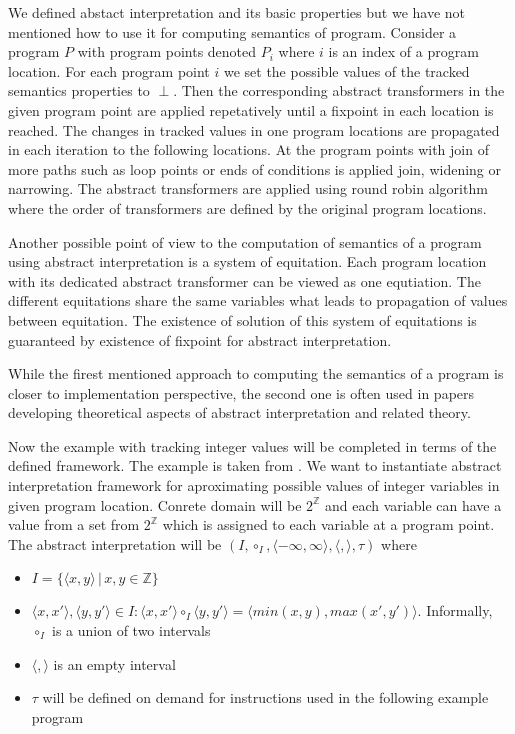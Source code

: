 \documentclass[a4paper, 12pt]{article}
\newcommand{\interval}[2]{\langle #1,#2 \rangle}
\newcommand{\ainf}[0]{\perp}
\newcommand{\atrans}[0]{\tau}
\newcommand{\ajoin}[0]{\circ}
\newcommand{\intg}[0]{\mathbb{Z}}
\newcommand{\iintg}[0]{I}
\newcommand{\ijoin}[0]{\ajoin_\iintg}
\begin{document}
We defined abstact interpretation and its basic properties
but we have not mentioned how to use it for computing
semantics of program.
Consider a program $P$ with program points denoted $P_i$
where $i$ is an index of a program location.
For each program point $i$ we set the possible values of the tracked
semantics properties to $\ainf$.
Then the corresponding abstract transformers in the given program point
are applied repetatively until a fixpoint in each location is reached.
The changes in tracked values in one program locations are propagated in each iteration to the
following locations.
At the program points with join of more paths such as loop points or ends of conditions
is applied join, widening or narrowing.
The abstract transformers are applied using round robin algorithm where
the order of transformers are defined by the original program locations.

Another possible point of view to the computation of semantics of a program using
abstract interpretation is a system of equitation.
Each program location with its dedicated abstract transformer can be viewed
as one equtiation.
The different equitations share the same variables what leads to propagation
of values between equitation.
The existence of solution of this system of equitations is guaranteed by
existence of fixpoint for abstract interpretation.

While the firest mentioned approach to computing the semantics of a program is
closer to implementation perspective, the second one is often used in papers
developing theoretical aspects of abstract interpretation and related theory.

\bexmp
Now the example with tracking integer values will be completed in terms of the defined framework.
The example is taken from \cite{popl77}.
We want to instantiate abstract interpretation framework for aproximating
possible values of integer variables in given program location.
Conrete domain will be $2^\mathbb{\intg}$ and each variable can
have a value from a set from $2^\mathbb{\intg}$ which is assigned to each variable
at a program point.
The abstract interpretation will be $(\iintg, \ijoin, \interval{-\infty}{\infty}, \interval{}{}, \atrans)$ where 
\begin{itemize}
	\item $\iintg = \{\interval{x}{y} \,|\, x,y \in \intg\}$
	\item $\interval{x}{x'}, \interval{y}{y'} \in \iintg: \interval{x}{x'} \ijoin \interval{y}{y'}
		= \interval{min(x,y)}{max(x',y')}$. Informally, $\ijoin$ is a union of two intervals
	\item $\interval{}{}$ is an empty interval
	\item $\atrans$ will be defined on demand for instructions used in the following example program
\end{itemize}
\end{document}
